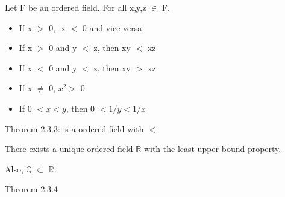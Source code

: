 \qquad Let F be an ordered field. For all x,y,z $\in$ F.
\begin{itemize}[leftmargin=2cm]
	\item If x $>$ 0, -x $<$ 0 and vice versa
	
	\item If x $>$ 0 and y $<$ z, then xy $<$ xz
	
	\item If x $ < $ 0 and y $ < $ z, then xy $ > $ xz
	
	\item If x $\neq$ 0, $x^2 > $ 0
	
	\item If 0 $< x < y$, then 0 $< 1/y < 1/x$
\end{itemize}

{\color{red} Theorem 2.3.3:  is a ordered field with $<$ }

\qquad There exists a unique ordered field $ \mathbb{R} $ with the least upper bound property.

\qquad Also, $ \mathbb{Q} $  $\subset$ $ \mathbb{R} $. \\

\newpage

{\color{red} Theorem 2.3.4}

